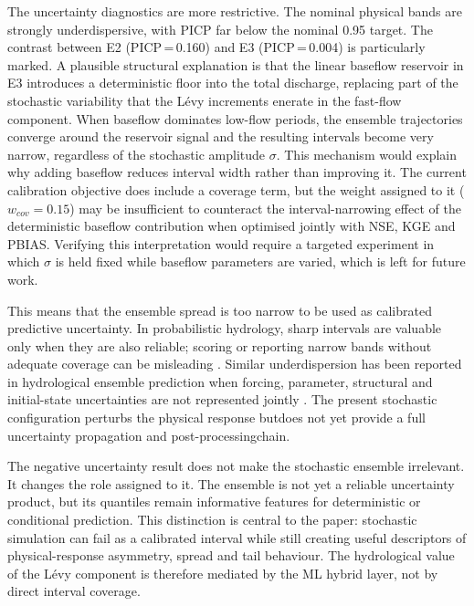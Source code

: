 \documentclass[a4paper,fleqn]{cas-sc}
\begin{document}
The uncertainty diagnostics are more restrictive. The nominal physical bands are strongly underdispersive, with PICP far below the nominal 0.95 target. The contrast between E2 (PICP\,=\,0.160) and E3 (PICP\,=\,0.004) is particularly marked. A plausible structural explanation is that the linear baseflow reservoir in E3 introduces a deterministic floor into the total discharge, replacing part of the stochastic variability that the L\'{e}vy increments enerate in the fast-flow component. When baseflow dominates low-flow periods, the ensemble trajectories converge around the reservoir signal and the resulting intervals become very narrow, regardless of the stochastic amplitude $\sigma$. This mechanism would explain why adding baseflow reduces interval width rather than improving it. The current
calibration objective does include a coverage term, but the weight assigned to it ($w_{cov}=0.15$) may be insufficient to counteract the interval-narrowing effect of the deterministic baseflow contribution when optimised jointly with NSE, KGE and PBIAS. Verifying this
interpretation would require a targeted experiment in which $\sigma$ is held fixed while baseflow parameters are varied, which is left for future work.

This means that the ensemble spread is too narrow to be used as calibrated predictive uncertainty. In probabilistic hydrology, sharp intervals are valuable only when they are also reliable; scoring or reporting narrow bands without adequate coverage can be misleading
\citep{atger1999skill,franz2011evaluating,papacharalampous2022review}. Similar underdispersion has been reported in hydrological ensemble prediction when forcing, parameter, structural and initial-state uncertainties are not represented jointly
\citep{demirel2013effect,thiboult2016accounting,crochemore2016bias}. The present stochastic configuration perturbs the physical response butdoes not yet provide a full uncertainty propagation and post-processingchain.

The negative uncertainty result does not make the stochastic ensemble irrelevant. It changes the role assigned to it. The ensemble is not yet a reliable uncertainty product, but its quantiles remain informative features for deterministic or conditional prediction. This distinction is central to the paper: stochastic simulation can fail as a calibrated
interval while still creating useful descriptors of physical-response asymmetry, spread and tail behaviour. The hydrological value of the L\'{e}vy component is therefore mediated by the ML hybrid layer, not by direct interval coverage.
\end{document}
